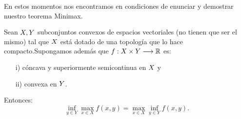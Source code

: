 En estos momentos nos encontramos en condiciones de enunciar y demostrar nuestro teorema Minimax.
\begin{teoremaBox}\label{MinMax}
Sean $ X, Y $ subconjuntos convexos de espacios vectoriales (no tienen que ser el mismo) tal que $ X $ está dotado de una topología que lo hace compacto.Supongamos además que $ f:  X \times Y \longrightarrow \mathbb{R} $ es:
\begin{itemize}	
\item[i)] cóncava y superiormente semicontinua en $ X $ y
\item[ii)] convexa en $ Y $.
\end{itemize}
Entonces:
\begin{equation*}\label{eqMinMax}
\inf_{y \in Y} \max_{x \in X} f(x,y) = \max_{x \in X} \inf_{y \in Y} f(x,y).
\end{equation*}
\end{teoremaBox}

